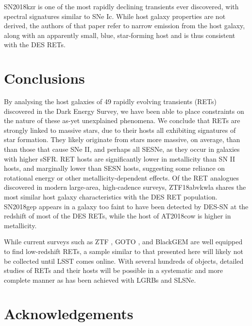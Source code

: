 \documentclass[fleqn,usenatbib,]{mnras}
\begin{document}
SN2018kzr \citep{McBrien2019} is one of the most rapidly declining transients ever discovered, with spectral signatures similar to SNe Ic. While host galaxy properties are not derived, the authors of that paper refer to narrow emission from the host galaxy, along with an apparently small, blue, star-forming host and is thus consistent with the DES RETs.


\section{Conclusions}
\label{sec:conc}
By analysing the host galaxies of 49 rapidly evolving transients (RETs) discovered in the Dark Energy Survey, we have been able to place constraints on the nature of these as-yet unexplained phenomena. We conclude that RETs are strongly linked to massive stars, due to their hosts all exhibiting signatures of star formation. They likely originate from stars more massive, on average, than than those that cause SNe II, and perhaps all SESNe, as they occur in galaxies with higher sSFR. RET hosts are significantly lower in metallicity than SN II hosts, and marginally lower than SESN hosts, suggesting some reliance on rotational energy or other metallicity-dependent effects.
Of the RET analogues discovered in modern large-area, high-cadence surveys, ZTF18abvkwla shares the most similar host galaxy characteristics with the DES RET population. SN2018gep appears in a galaxy too faint to have been detected by DES-SN at the redshift of most of the DES RETs, while the host of AT2018cow is higher in metallicity.

While current surveys such as ZTF \citep{Bellm2019}, GOTO \citep{Dyer2018}, and BlackGEM \citep{Bloemen2016} are well equipped to find low-redshift RETs, a sample similar to that presented here will likely not be collected until LSST comes online. With several hundreds of objects, detailed studies of RETs and their hosts will be possible in a systematic and more complete manner as has been achieved with LGRBs and SLSNe.

\section*{Acknowledgements}
\end{document}
